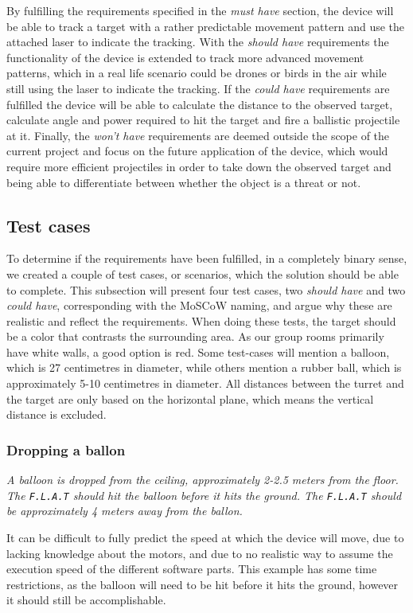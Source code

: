 By fulfilling the requirements specified in the \textit{must have} section, the device will be able to track a target with a rather predictable movement pattern and use the attached laser to indicate the tracking.
With the \textit{should have} requirements the functionality of the device is extended to track more advanced movement patterns, which in a real life scenario could be drones or birds in the air while still using the laser to indicate the tracking.
If the \textit{could have} requirements are fulfilled the device will be able to calculate the distance to the observed target, calculate angle and power required to hit the target and fire a ballistic projectile at it.
Finally, the \textit{won't have} requirements are deemed outside the scope of the current project and focus on the future application of the device, which would require more efficient projectiles in order to take down the observed target and being able to differentiate between whether the object is a threat or not.

\subsection{Test cases}
To determine if the requirements have been fulfilled, in a completely binary sense, we created a couple of test cases, or scenarios, which the solution should be able to complete.
This subsection will present four test cases, two \textit{should have} and two \textit{could have}, corresponding with the MoSCoW naming, and argue why these are realistic and reflect the requirements.
When doing these tests, the target should be a color that contrasts the surrounding area.
As our group rooms primarily have white walls, a good option is red.
Some test-cases will mention a balloon, which is 27 centimetres in diameter, while others mention a rubber ball, which is approximately 5-10 centimetres in diameter.
All distances between the turret and the target are only based on the horizontal plane, which means the vertical distance is excluded.

\subsubsection{Dropping a ballon}
\textit{A balloon is dropped from the ceiling, approximately 2-2.5 meters from the floor.
The \texttt{F.L.A.T} should hit the balloon before it hits the ground.
The \texttt{F.L.A.T} should be approximately 4 meters away from the ballon.}

It can be difficult to fully predict the speed at which the device will move, due to lacking knowledge about the motors, and due to no realistic way to assume the execution speed of the different software parts.
This example has some time restrictions, as the balloon will need to be hit before it hits the ground, however it should still be accomplishable.

